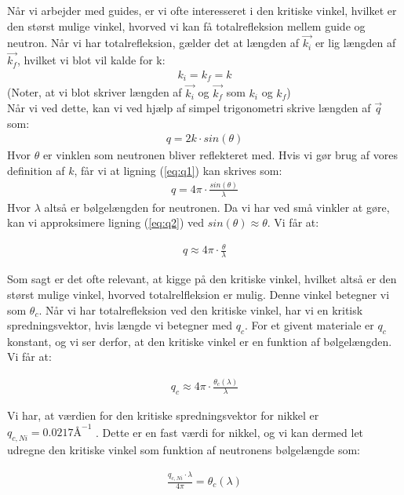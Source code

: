 \documentclass[12pt,oneside,a4paper]{article}
\begin{document}
{{{{{Når vi arbejder med guides, er vi ofte interesseret i den kritiske vinkel, hvilket er den størst mulige vinkel, hvorved vi kan få totalrefleksion mellem guide og neutron. Når vi har totalrefleksion, gælder det at længden af $\vec{k_i}$ er lig længden af $\vec{k_f}$, hvilket vi blot vil kalde for k:
\begin{align}
k_i=k_f=k
\end{align}
(Noter, at vi blot skriver længden af $\vec{k_i}$ og $\vec{k_f}$ som $k_i$ og $k_f$) \\
Når vi ved dette, kan vi ved hjælp af simpel trigonometri skrive længden af $\vec{q}$ som:
\begin{align} \label{eq:q1}
q=2k \cdot sin(\theta)
\end{align}
Hvor $\theta$ er vinklen som neutronen bliver reflekteret med. Hvis vi gør brug af vores definition af $k$, får vi at ligning (\ref{eq:q1}) kan skrives som:
\begin{align} \label{eq:q2}
q=4\pi \cdot \frac{sin(\theta)}{\lambda}
\end{align}
Hvor $\lambda$ altså er bølgelængden for neutronen. Da vi har ved små vinkler at gøre, kan vi approksimere ligning (\ref{eq:q2})  ved $sin(\theta)≈\theta$. Vi får at:

\begin{align}
q≈4\pi \cdot \frac{\theta}{\lambda}
\end{align}

Som sagt er det ofte relevant, at kigge på den kritiske vinkel, hvilket altså er den størst mulige vinkel, hvorved totalrelfleksion er mulig. Denne vinkel betegner vi som $\theta_c$. Når vi har totalrefleksion ved den kritiske vinkel, har vi en kritisk spredningsvektor, hvis længde vi betegner med $q_c$. For et givent materiale er $q_c$ konstant, og vi ser derfor, at den kritiske vinkel er en funktion af bølgelængden. Vi får at:

\begin{align}
q_c≈4\pi \cdot \frac{\theta_c(\lambda)}{\lambda}
\end{align}

Vi har, at værdien for den kritiske spredningsvektor for nikkel er $q_{c, Ni}=0.0217\text{Å} ^{-1}$ \cite{lefmann_arleth_kirkensgaard_lebech_thomsen}. Dette er en fast værdi for nikkel, og vi kan dermed let udregne den kritiske vinkel som funktion af neutronens bølgelængde som: 

\begin{align}
\frac{q_{c,Ni} \cdot \lambda}{4\pi}=\theta_c(\lambda)
\end{align}

}}}}}
\end{document}
